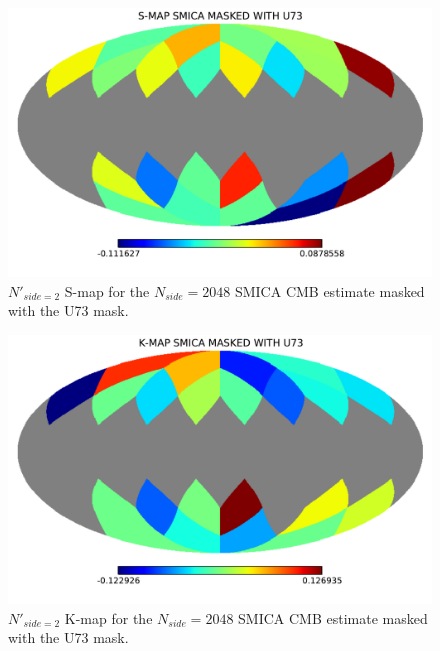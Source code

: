 \begin{figure}
\centering
\includegraphics[width=\textwidth]{figures/chapter-vsk/smap-u73-smica.pdf}
\caption{$N'_{side = 2}$ S-map for the $N_{side} = 2048$ SMICA CMB estimate masked with the U73 mask.}
\label{Fig:3a}
\end{figure}

\begin{figure}
\centering
\includegraphics[width=\textwidth]{figures/chapter-vsk/kmap-u73-smica.pdf}
\caption{$N'_{side = 2}$  K-map for the $N_{side} = 2048$ SMICA CMB estimate masked with the U73 mask.}
\label{Fig:3b}
\end{figure}

